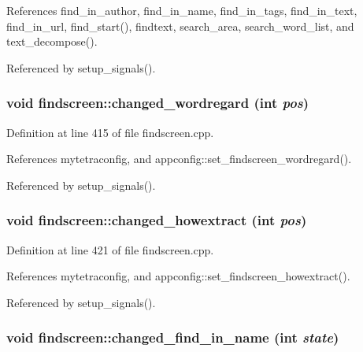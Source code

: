 References find\_\-in\_\-author, find\_\-in\_\-name, find\_\-in\_\-tags, find\_\-in\_\-text, find\_\-in\_\-url, find\_\-start(), findtext, search\_\-area, search\_\-word\_\-list, and text\_\-decompose().

Referenced by setup\_\-signals().
\subsubsection{\setlength{\rightskip}{0pt plus 5cm}void findscreen::changed\_\-wordregard (int {\em pos})\hspace{0.3cm}{\tt  [private, slot]}}\label{classfindscreen_b0f32bea1e76a5263b1c4cf6e7643286}




Definition at line 415 of file findscreen.cpp.

References mytetraconfig, and appconfig::set\_\-findscreen\_\-wordregard().

Referenced by setup\_\-signals().
\subsubsection{\setlength{\rightskip}{0pt plus 5cm}void findscreen::changed\_\-howextract (int {\em pos})\hspace{0.3cm}{\tt  [private, slot]}}\label{classfindscreen_126053d4303a298456cf23fafbd5fb35}




Definition at line 421 of file findscreen.cpp.

References mytetraconfig, and appconfig::set\_\-findscreen\_\-howextract().

Referenced by setup\_\-signals().
\subsubsection{\setlength{\rightskip}{0pt plus 5cm}void findscreen::changed\_\-find\_\-in\_\-name (int {\em state})\hspace{0.3cm}{\tt  [private, slot]}}\label{classfindscreen_d3c62a8391936290284f8a2a51d9e285}




